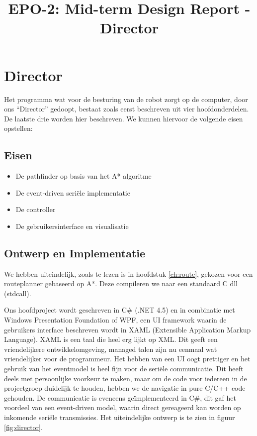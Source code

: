 \documentclass{report}
\title{EPO-2: Mid-term Design Report - Director}
\author{}
\begin{document}
\chapter{Director}
\label{ch:director}
Het programma wat voor de besturing van de robot zorgt op de computer, door ons ``Director'' gedoopt, bestaat zoals eerst beschreven uit vier hoofdonderdelen. De laatste drie worden hier beschreven. We kunnen hiervoor de volgende eisen opstellen:

\section{Eisen}
\begin{itemize}
\item De pathfinder op basis van het A* algoritme
\item De event-driven seriële implementatie
\item De controller
\item De gebruikersinterface en visualisatie
\end{itemize}

\section{Ontwerp en Implementatie}
\label{sec:dirImplementatie}
We hebben uiteindelijk, zoals te lezen is in hoofdstuk \ref{ch:route}, gekozen voor een routeplanner gebaseerd op A*. Deze compileren we naar een standaard C dll (stdcall).

Ons hoofdproject wordt geschreven in C\# (.NET 4.5) en in combinatie met Windows Presentation Foundation of WPF, een UI framework waarin de gebruikers interface beschreven wordt in XAML (Extensible Application Markup Language).
XAML is een taal die heel erg lijkt op XML.
Dit geeft een vriendelijkere ontwikkelomgeving, managed talen zijn nu eenmaal wat vriendelijker voor de programmeur.
Het hebben van een UI oogt prettiger en het gebruik van het eventmodel is heel fijn voor de seriële communicatie.
Dit heeft deels met persoonlijke voorkeur te maken, maar om de code voor iedereen in de projectgroep duidelijk te houden, hebben we de navigatie in pure C/C++ code gehouden.
De communicatie is eveneens geïmplementeerd in C\#, dit gaf het voordeel van een event-driven model, waarin direct gereageerd kan worden op inkomende seriële transmissies. Het uiteindelijke ontwerp is te zien in figuur \ref{fig:director}.
\end{document}
